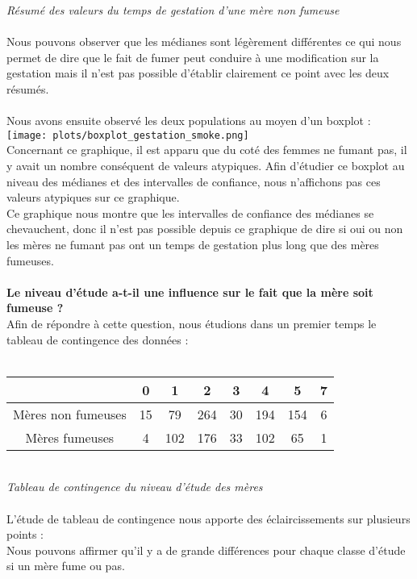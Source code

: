 \documentclass[a4paper, 10pt]{article}
\begin{document}
\textit{R\'esum\'e des valeurs du temps de gestation d'une m\`ere non fumeuse}\\ \\
Nous pouvons observer que les m\'edianes sont l\'eg\`erement diff\'erentes ce qui nous permet de dire que le fait de fumer peut conduire \`a
une modification sur la gestation mais il n'est pas possible d'établir clairement ce point avec les deux r\'esum\'es.\\ \\
Nous avons ensuite observ\'e les deux populations au moyen d'un boxplot :\\
\texttt{[image: plots/boxplot\_gestation\_smoke.png]}\\
Concernant ce graphique, il est apparu que du cot\'e des femmes ne fumant pas, il y avait un nombre cons\'equent de valeurs atypiques.
Afin d'\'etudier ce boxplot au niveau des m\'edianes et des intervalles de confiance, nous n'affichons pas
ces valeurs atypiques sur ce graphique.\\
Ce graphique nous montre que les intervalles de confiance des m\'edianes se chevauchent, donc il n'est pas possible depuis ce graphique de
dire si oui ou non les m\`eres ne fumant pas ont un temps de gestation plus long que des m\`eres fumeuses.\\ \\
\textbf{Le niveau d'\'etude a-t-il une influence sur le fait que la m\`ere soit fumeuse ?}\\
Afin de r\'epondre \`a cette question, nous \'etudions dans un premier temps le tableau de contingence des donn\'ees :\\ \\
\begin{tabular}{|c|c|c|c|c|c|c|c|}
\hline
 & 0 & 1 & 2 & 3 & 4 & 5 & 7\\
\hline
M\`eres non fumeuses & 15 & 79 & 264 & 30 & 194 & 154 & 6 \\
\hline
M\`eres fumeuses & 4 & 102 & 176 & 33 & 102 & 65 & 1 \\
\hline
\end{tabular}\\
\textit{Tableau de contingence du niveau d'étude des mères}\\ \\
L'\'etude de tableau de contingence nous apporte des \'eclaircissements sur plusieurs points :\\
Nous pouvons affirmer qu'il y a de grande diff\'erences pour chaque classe d'\'etude si un m\`ere fume ou pas.
\end{document}
